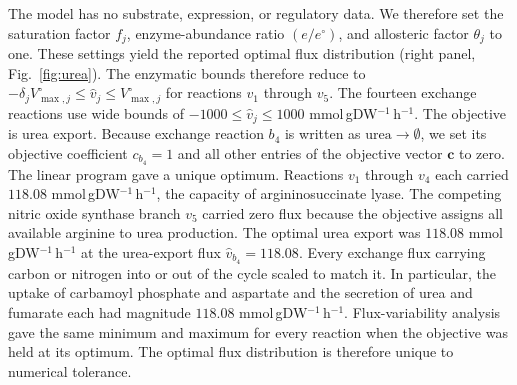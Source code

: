 The model has no substrate, expression, or regulatory data. We therefore set
the saturation factor $f_j$, enzyme-abundance ratio $(e/e^{\circ})$, and
allosteric factor $\theta_j$ to one. These settings yield the reported optimal
flux distribution (right panel, Fig.~\ref{fig:urea}). The enzymatic bounds therefore reduce to
$-\delta_j V^{\circ}_{\max,j}\le\hat v_j\le V^{\circ}_{\max,j}$ for reactions
$v_1$ through $v_5$. The fourteen exchange reactions use wide bounds of
$-1000\le\hat v_j\le1000$ mmol\,gDW$^{-1}$\,h$^{-1}$. The objective is urea
export. Because exchange reaction $b_4$ is written as
$\text{urea}\to\emptyset$, we set its objective coefficient $c_{b_4}=1$ and
all other entries of the objective vector $\mathbf c$ to zero. The linear program
\cite{Orth2010} gave a unique optimum. Reactions $v_1$
through $v_4$ each carried $118.08$ mmol\,gDW$^{-1}$\,h$^{-1}$, the capacity
of argininosuccinate lyase. The competing nitric oxide synthase branch
$v_5$ carried zero flux because the objective assigns all available arginine
to urea production. The optimal urea export was
$118.08$ mmol\,gDW$^{-1}$\,h$^{-1}$ at
the urea-export flux $\hat v_{b_4}=118.08$. Every exchange flux carrying
carbon or nitrogen into or out of the cycle scaled to match it. In particular,
the uptake of carbamoyl phosphate and aspartate and the secretion of urea and
fumarate each had magnitude $118.08$ mmol\,gDW$^{-1}$\,h$^{-1}$.
Flux-variability analysis gave
the same minimum and maximum for every reaction when the objective was held
at its optimum. The optimal flux distribution is therefore unique to
numerical tolerance.

